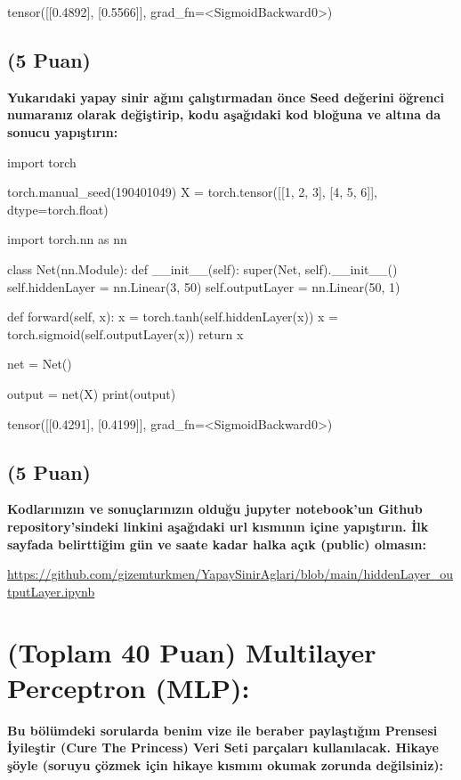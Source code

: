 \documentclass[11pt]{article}
\begin{document}
tensor([[0.4892],
        [0.5566]], grad_fn=<SigmoidBackward0>)

\subsection{(5 Puan)} \textbf{Yukarıdaki yapay sinir ağını çalıştırmadan önce Seed değerini öğrenci numaranız olarak değiştirip, kodu aşağıdaki kod bloğuna ve altına da sonucu yapıştırın:}

\begin{python}
import torch

torch.manual_seed(190401049)  
X = torch.tensor([[1, 2, 3], [4, 5, 6]], dtype=torch.float)  

import torch.nn as nn

class Net(nn.Module):
    def __init__(self):
        super(Net, self).__init__()
        self.hiddenLayer = nn.Linear(3, 50)  
        self.outputLayer = nn.Linear(50, 1)  

    def forward(self, x):
        x = torch.tanh(self.hiddenLayer(x))  
        x = torch.sigmoid(self.outputLayer(x))  
        return x

net = Net()  

output = net(X)
print(output)
\end{python}

tensor([[0.4291],
        [0.4199]], grad_fn=<SigmoidBackward0>) 

\subsection{(5 Puan)} \textbf{Kodlarınızın ve sonuçlarınızın olduğu jupyter notebook'un Github repository'sindeki linkini aşağıdaki url kısmının içine yapıştırın. İlk sayfada belirttiğim gün ve saate kadar halka açık (public) olmasın:}

\url{https://github.com/gizemturkmen/YapaySinirAglari/blob/main/hiddenLayer_outputLayer.ipynb}

\section{(Toplam 40 Puan) Multilayer Perceptron (MLP):} 
\textbf{Bu bölümdeki sorularda benim vize ile beraber paylaştığım Prensesi İyileştir (Cure The Princess) Veri Seti parçaları kullanılacak. Hikaye şöyle (soruyu çözmek için hikaye kısmını okumak zorunda değilsiniz):} 
\end{document}
